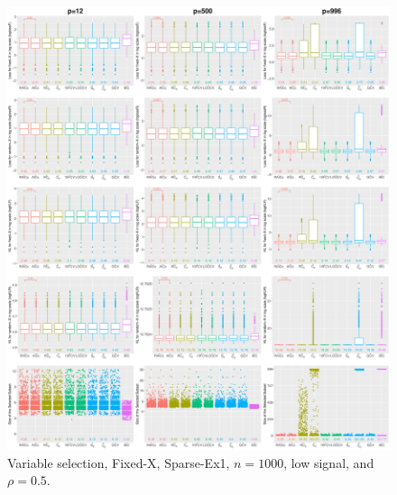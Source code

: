 \begin{figure}[!ht]
\centering
\includegraphics[width=\textwidth]{figures/supplement/fixedx/subset_selection/Sparse-Ex1_n1000_lsnr_rho05.eps}
\caption{Variable selection, Fixed-X, Sparse-Ex1, $n=1000$, low signal, and $\rho=0.5$.}
\end{figure}
\clearpage
